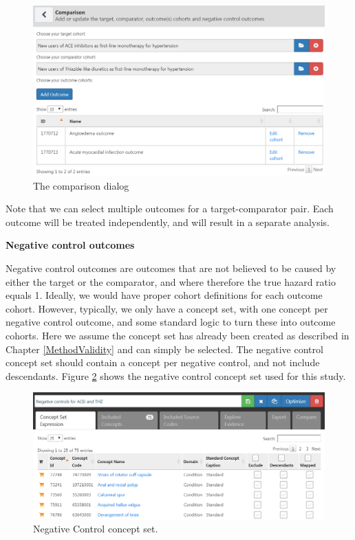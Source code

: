 \documentclass[11pt]{book}
\theoremstyle{definition}
\theoremstyle{definition}
\theoremstyle{definition}
\theoremstyle{remark}
\begin{document}
\begin{figure}

{\centering \includegraphics[width=1\linewidth]{images/PopulationLevelEstimation/comparisons} 

}

\caption{The comparison dialog}\label{fig:comparisons}
\end{figure}

Note that we can select multiple outcomes for a target-comparator pair. Each outcome will be treated independently, and will result in a separate analysis.

\textbf{Negative control outcomes}

Negative control outcomes are outcomes that are not believed to be caused by either the target or the comparator, and where therefore the true hazard ratio equals 1. Ideally, we would have proper cohort definitions for each outcome cohort. However, typically, we only have a concept set, with one concept per negative control outcome, and some standard logic to turn these into outcome cohorts. Here we assume the concept set has already been created as described in Chapter \ref{MethodValidity} and can simply be selected. The negative control concept set should contain a concept per negative control, and not include descendants. Figure \ref{fig:ncConceptSet} shows the negative control concept set used for this study.

\begin{figure}

{\centering \includegraphics[width=1\linewidth]{images/PopulationLevelEstimation/ncConceptSet} 

}

\caption{Negative Control concept set.}\label{fig:ncConceptSet}
\end{figure}
\end{document}
